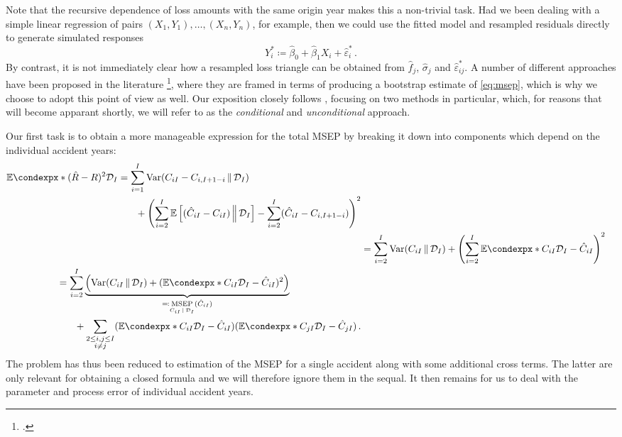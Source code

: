 \documentclass[a4paper]{book}
\theoremstyle{plain}
\newcommand{\condexp}{\mathbb{E}\condexpx}
\begin{document}
Note that the recursive dependence of loss amounts with the same origin year makes this a non-trivial task. Had we been dealing with a simple linear regression of pairs ${(X_1, Y_1), \dots, (X_n, Y_n)}$, for example, then we could use the fitted model and resampled residuals directly to generate simulated responses
\begin{equation}
    Y^*_i \coloneqq \hat{\beta}_0 + \hat{\beta}_1 X_i + \hat{\varepsilon}^*_i \,.
\end{equation}
By contrast, it is not immediately clear how a resampled loss triangle can be obtained from $\hat{f}_j$, $\hat{\sigma}_j$ and $\hat{\varepsilon}^*_{ij}$. A number of different approaches have been proposed in the literature  \footcites[See, for example,][Section~D6]{mack:chain-ladder-variability}{wuthrich:chain-ladder-msep}, where they are framed in terms of producing a bootstrap estimate of \eqref{eq:msep}, which is why we choose to adopt this point of view as well. Our exposition closely follows \cite[45\psqq]{wuthrich:stochastic-reserving}, focusing on two methods in particular, which, for reasons that will become apparant shortly, we will refer to as the \emph{conditional} and \emph{unconditional} approach.

Our first task is to obtain a more manageable expression for the total MSEP by breaking it down into components which depend on the individual accident years:
\begin{align}
    \begin{split}
    \condexp*{(\hat{R} - R)^2}{\mathcal{D}_I} &=
        \sum_{i=1}^I \mathrm{Var}(C_{iI} - C_{i, I + 1 - i} \, \Vert \, \mathcal{D}_I) \\ 
        &\phantom{{}=1} + \left( \sum_{i=2}^I \mathbb{E} \left[ (\hat{C}_{iI} - C_{iI}) \, \Big \rVert \, \mathcal{D}_I \right] - \sum_{i=2}^I (\hat{C}_{iI} - C_{i, I + 1 - i}) \right)^2
    \end{split} \\
    &= \sum_{i=2}^I \mathrm{Var}(C_{iI} \, \Vert \, \mathcal{D}_I) + \left( \sum_{i=2}^I \condexp*{C_{iI}}{\mathcal{D}_I} - \hat{C}_{iI} \right)^2 \\
    \begin{split} \label{eq:msep-decomposition}
    &= \sum_{i=2}^I \underbrace{\left(\mathrm{Var}(C_{iI} \, \Vert \, \mathcal{D}_I) + (\condexp*{C_{iI}}{\mathcal{D}_I} - \hat{C}_{iI})^2 \right)}_{\eqqcolon \underset{C_{iI} \, \vert \, \mathcal{D}_I}{\mathrm{MSEP}}(\hat{C}_{iI})} \\
    &\phantom{{}=1} + \sum_{\substack{2 \leq i, j \leq I \\ i \neq j}} (\condexp*{C_{iI}}{\mathcal{D}_I} - \hat{C}_{iI})(\condexp*{C_{jI}}{\mathcal{D}_I} - \hat{C}_{jI}) \,.
    \end{split}
\end{align}
The problem has thus been reduced to estimation of the MSEP for a single accident along with some additional cross terms. The latter are only relevant for obtaining a closed formula and we will therefore ignore them in the sequal. It then remains for us to deal with the parameter and process error of individual accident years.
\end{document}

